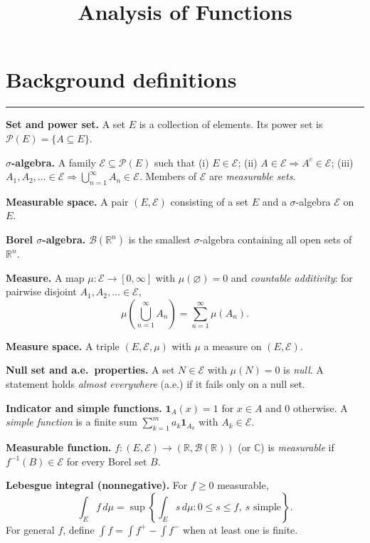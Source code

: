 \documentclass[12pt,a4paper]{article}
\title{\Large Analysis of Functions}
\author{}
\date{}
\theoremstyle{plain}
\theoremstyle{definition}
\theoremstyle{remark}
\theoremstyle{remark}
\newcommand{\tighthrule}{\vspace{0.6\baselineskip}\hrule\vspace{0.8\baselineskip}}
\newenvironment{spacy}{\begingroup\setlength{\parskip}{6pt}\setlength{\parindent}{0pt}}{\endgroup}
\theoremstyle{definition}
\begin{document}
	
	\maketitle
	
	
\section*{Background definitions}

\tighthrule
\begin{spacy}
	\textbf{Set and power set.}
	A set $E$ is a collection of elements. Its power set is $\mathcal P(E)=\{A\subseteq E\}$.
	
	\textbf{$\sigma$-algebra.}
	A family $\mathcal E\subseteq \mathcal P(E)$ such that
	(i) $E\in\mathcal E$; \;
	(ii) $A\in\mathcal E \Rightarrow A^{c}\in\mathcal E$; \;
	(iii) $A_1,A_2,\dots\in\mathcal E \Rightarrow \bigcup_{n=1}^{\infty} A_n \in \mathcal E$.
	Members of $\mathcal E$ are \emph{measurable sets}.
	
	\textbf{Measurable space.}
	A pair $(E,\mathcal E)$ consisting of a set $E$ and a $\sigma$-algebra $\mathcal E$ on $E$.
	
	\textbf{Borel $\sigma$-algebra.}
	$\mathcal B(\mathbb R^n)$ is the smallest $\sigma$-algebra containing all open sets of $\mathbb R^n$.
	
	\textbf{Measure.}
	A map $\mu:\mathcal E\to[0,\infty]$ with $\mu(\varnothing)=0$ and
	\emph{countable additivity}: for pairwise disjoint $A_1,A_2,\dots\in\mathcal E$,
	\[
	\mu\!\left(\bigcup_{n=1}^\infty A_n\right)=\sum_{n=1}^\infty \mu(A_n).
	\]
	
	\textbf{Measure space.}
	A triple $(E,\mathcal E,\mu)$ with $\mu$ a measure on $(E,\mathcal E)$.
	
	\textbf{Null set and a.e.\ properties.}
	A set $N\in\mathcal E$ with $\mu(N)=0$ is \emph{null}.
	A statement holds \emph{almost everywhere} (a.e.) if it fails only on a null set.
	
	\textbf{Indicator and simple functions.}
	$\mathbf 1_{A}(x)=1$ for $x\in A$ and $0$ otherwise.
	A \emph{simple function} is a finite sum $\sum_{k=1}^m a_k \mathbf 1_{A_k}$ with $A_k\in\mathcal E$.
	
	\textbf{Measurable function.}
	$f:(E,\mathcal E)\to(\mathbb R,\mathcal B(\mathbb R))$ (or $\mathbb C$) is \emph{measurable} if
	$f^{-1}(B)\in\mathcal E$ for every Borel set $B$.
	
	\textbf{Lebesgue integral (nonnegative).}
	For $f\ge0$ measurable,
	\[
	\int_E f\,d\mu = \sup\left\{ \int_E s\,d\mu : 0\le s\le f,\ s \text{ simple} \right\}.
	\]
	For general $f$, define $\int f = \int f^{+}-\int f^{-}$ when at least one is finite.
	

\end{spacy}
\end{document}
